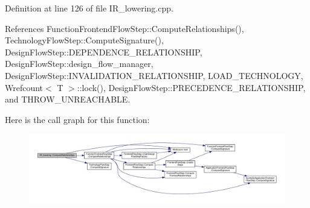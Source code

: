Definition at line 126 of file I\+R\+\_\+lowering.\+cpp.



References Function\+Frontend\+Flow\+Step\+::\+Compute\+Relationships(), Technology\+Flow\+Step\+::\+Compute\+Signature(), Design\+Flow\+Step\+::\+D\+E\+P\+E\+N\+D\+E\+N\+C\+E\+\_\+\+R\+E\+L\+A\+T\+I\+O\+N\+S\+H\+IP, Design\+Flow\+Step\+::design\+\_\+flow\+\_\+manager, Design\+Flow\+Step\+::\+I\+N\+V\+A\+L\+I\+D\+A\+T\+I\+O\+N\+\_\+\+R\+E\+L\+A\+T\+I\+O\+N\+S\+H\+IP, L\+O\+A\+D\+\_\+\+T\+E\+C\+H\+N\+O\+L\+O\+GY, Wrefcount$<$ T $>$\+::lock(), Design\+Flow\+Step\+::\+P\+R\+E\+C\+E\+D\+E\+N\+C\+E\+\_\+\+R\+E\+L\+A\+T\+I\+O\+N\+S\+H\+IP, and T\+H\+R\+O\+W\+\_\+\+U\+N\+R\+E\+A\+C\+H\+A\+B\+LE.

Here is the call graph for this function\+:
\nopagebreak
\begin{figure}[H]
\begin{center}
\leavevmode
\includegraphics[width=350pt]{df/d7d/classIR__lowering_a47d1e16e6d42ddac272d166329013fd4_cgraph}
\end{center}
\end{figure}
\mbox{\label{classIR__lowering_ad68af9b9031624406acd7557e3e30c9f}} 
